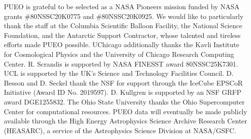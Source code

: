 PUEO is grateful to be selected as a NASA Pioneers mission funded by NASA grants \#80NSSC20K0775 and \#80NSSC20K0925.
We would like to particularly thank the staff at the Columbia Scientific Balloon Facility, the National Science Foundation, and the Antarctic Support Contractor, whose talented and tireless efforts made PUEO possible.
UChicago additionally thanks the Kavli Institute for Cosmological Physics and the University of Chicago Research Computing Center.
R. Scrandis is supported by NASA FINESST award 80NSSC25K7301.
UCL is supported by the UK's Science and Technology Facilities Council.
D. Besson and D. Seckel thank the NSF for support through the IceCube EPSCoR Initiative (Award ID No. 2019597).
D. Kullgren is supported by an NSF GRFP award DGE1255832.
The Ohio State University thanks the Ohio Supercomputer Center for computational resources.
PUEO data will eventually be made publicly available through the High Energy Astrophysics Science Archive Research Center (HEASARC), a service of the Astrophysics Science Division at NASA/GSFC.